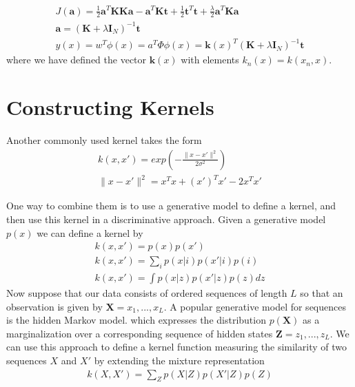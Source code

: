 \documentclass[a4paper]{article}
\begin{document}
\begin{align}
J(\mathbf{a}) = \frac{1}{2} \mathbf{a}^T \mathbf{K} \mathbf{K} \mathbf{a} - \mathbf{a}^T
  \mathbf{K} \mathbf{t} + \frac{1}{2} \mathbf{t}^T
  \mathbf{t} + \frac{\lambda}{2} \mathbf{a}^T \mathbf{K} \mathbf{a}
\\
\mathbf{a} = (\mathbf{K} + \lambda \mathit{\mathbf{I}_N})^{-1} \mathbf{t}
\\
y(x) = w^T\phi(x) = a^T\Phi\phi(x) = \mathbf{k}(x)^T (\mathbf{K} +
  \lambda \mathit{\mathbf{I}_N})^{-1} \mathbf{t}
\end{align}
where we have defined the vector $\mathbf{k}(x)$ with elements $k_n(x) = k(x_n, x)$.

\section{Constructing Kernels}
Another commonly used kernel takes the form
\begin{align}
k(x, x') = exp(-\frac{\|x-x'\|^2}{2\sigma^2})\\
\|x-x'\|^2 = x^Tx+(x')^Tx' -2x^Tx'
\end{align}

One way to combine them is to use a generative model to define a kernel, and then use this kernel in a discriminative approach.
Given a generative model $p(x)$ we can define a kernel by
\begin{align}
k(x, x') = p(x)p(x')\\
k(x, x') = \sum_{i}p(x|i)p(x'|i)p(i)\\
k(x, x') = \int p(x|z)p(x'|z)p(z)dz
\end{align}
Now suppose that our data consists of ordered sequences of length $L$
so that an observation is given by $\mathbf{X} = {x_1,...,x_L}$. A
popular generative model for sequences is the hidden Markov
model. which expresses the distribution $p(\mathbf{X})$ as a
marginalization over a corresponding sequence of hidden states
$\mathbf{Z} = {z_1,...,z_L}$. We can use this approach to define a
kernel function measuring the similarity of two sequences $X$ and $X'$
by extending the mixture representation
\begin{align}
k(X, X') = \sum_{Z}p(X|Z)p(X'|Z)p(Z)
\end{align}
\end{document}
